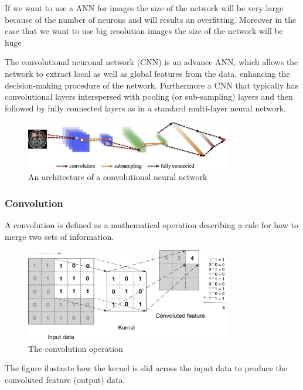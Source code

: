 If we want to use a ANN for images the size of the network will be very large because of the number of neurons and will results an overfitting. Moreover in the case that we want to use big resolution images the size of the network will be huge \cite{rajalingappaa}

The convolutional neuronal network (CNN) is an advance ANN, which allows the network to extract local as well as global features from the data, enhancing the decision-making procedure of the network\cite{abdullah}. Furthermore a CNN that typically has convolutional layers interspersed with pooling (or sub-sampling) layers and then followed by fully connected layers as in a standard multi-layer neural network.\cite{greenspan}

\begin{figure}[H]
\centering
\includegraphics[width=0.8\textwidth]{./figures/cnn}
\caption{An architecture of a convolutional neural network}
\end{figure}

\subsubsection[Convolution]{Convolution}

A convolution is defined as a mathematical operation describing a rule for how to merge two sets of information. \cite{starteddeeplearning}

\begin{figure}[H]
\centering
\includegraphics[width=0.8\textwidth]{./figures/convolution}
\caption{The convolution operation \cite{rajalingappaa}}
\end{figure}

The figure ilustrate how the kernel is slid across the input data to produce the convoluted feature (output) data. 

